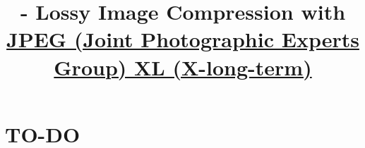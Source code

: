 

\title{\SM{} - Lossy Image Compression with \href{https://en.wikipedia.org/wiki/JPEG_XL}{JPEG (Joint Photographic Experts Group) XL (X-long-term)}}

\maketitle
\tableofcontents

\section{TO-DO}
